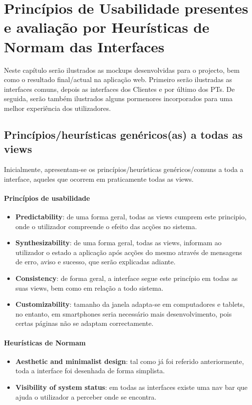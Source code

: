 \chapter{Princípios de Usabilidade presentes e avaliação por Heurísticas de Normam das Interfaces}
\label{chap:mockups}

\hspace{5mm} Neste capítulo serão ilustrados as mockups desenvolvidas para o projecto, bem como o resultado final/actual na aplicação web. Primeiro serão ilustradas as interfaces comuns, depois as interfaces dos Clientes e por último dos PTs. De seguida, serão também ilustrados alguns pormenores incorporados para uma melhor experiência dos utilizadores.


\section{Princípios/heurísticas genéricos(as) a todas as views}
\hspace{5mm} Inicialmente, apresentam-se os princípios/heurísticas genéricos/comuns a toda a interface, aqueles que ocorrem em praticamente todas as views.

\subsubsection{Princípios de usabilidade}
\begin{itemize}
    \item \textbf{Predictability}: de uma forma geral, todas as views cumprem este principio, onde o utilizador compreende o efeito das acções no sistema. 
    \item \textbf{Synthesizability}: de uma forma geral, todas as views, informam ao utilizador o estado a aplicação após acções do mesmo através de mensagens de erro, aviso e sucesso, que serão explicadas adiante.
    \item \textbf{Consistency}: de forma geral, a interface segue este princípio em todas as suas views, bem como em relação a todo sistema.
    \item \textbf{Customizability}: tamanho da janela adapta-se em computadores e tablets, no entanto, em smartphones seria necessário mais desenvolvimento, pois certas páginas não se adaptam correctamente.
\end{itemize}

\subsubsection{Heurísticas de Normam}
\begin{itemize}
    \item \textbf{Aesthetic and minimalist design}: tal como já foi referido anteriormente, toda a interface foi desenhada de forma simplista.
    \item \textbf{Visibility of system status}: em todas as interfaces existe uma nav bar que ajuda o utilizador a perceber onde se encontra. 
\end{itemize}

